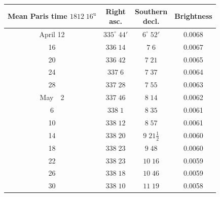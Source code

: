 \begin{center}
\fontsize{10}{12}\selectfont\setlength{\tabcolsep}{3pt}\renewcommand{\arraystretch}{1.15}\begin{tabular}{c|c|c|c}
\shortstack{Mean Paris time\\$1812\;16^{\mathrm u}$} & \shortstack{Right\\asc.} & \shortstack{Southern\\decl.} & Brightness \\
\hline
April 12 & $335^\circ\;44'$ & $6^\circ\;52'$ & 0.0068 \\
16 & $336\;14$ & $7\;6$ & 0.0067 \\
20 & $336\;42$ & $7\;21$ & 0.0065 \\
24 & $337\;6$ & $7\;37$ & 0.0064 \\
28 & $337\;28$ & $7\;55$ & 0.0063 \\
May\ \ 2 & $337\;46$ & $8\;14$ & 0.0062 \\
6 & $338\;1$ & $8\;35$ & 0.0061 \\
10 & $338\;12$ & $8\;57$ & 0.0061 \\
14 & $338\;20$ & $9\;21\tfrac{1}{2}$ & 0.0060 \\
18 & $338\;23$ & $9\;48$ & 0.0060 \\
22 & $338\;23$ & $10\;16$ & 0.0059 \\
26 & $338\;18$ & $10\;46$ & 0.0059 \\
30 & $338\;10$ & $11\;19$ & 0.0058 \\
\end{tabular}
\end{center}
